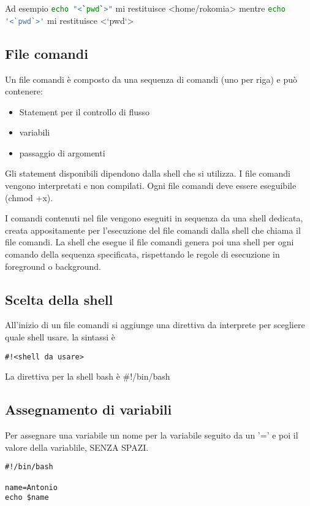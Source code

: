 \documentclass
[10pt,        %
 a4paper,     %
 onecolumn,   %
 fleqn,       %
 oneside,     %
 notitlepage, %
 openany      %
]{article}    %
\begin{document}
Ad esempio 
\lstinline[language=bash]!echo "<`pwd`>"! mi restituisce <home/rokomia> mentre
\lstinline[language=bash]!echo '<`pwd`>'! mi restituisce <`pwd`>

\subsection{File comandi}
Un file comandi è composto da una sequenza di comandi (uno per riga) e può contenere:
\begin{itemize}
    \item Statement per il controllo di flusso
    \item variabili
    \item passaggio di argomenti
\end{itemize}
Gli statement disponibili dipendono dalla shell che si utilizza. I file comandi vengono interpretati e non compilati. Ogni file comandi deve essere eseguibile (chmod +x).

I comandi contenuti nel file vengono eseguiti in sequenza da una shell dedicata, creata appositamente per l'esecuzione del file comandi dalla shell che chiama il file comandi. La shell che esegue il file comandi genera poi una shell per ogni comando della sequenza specificata, rispettando le regole di esecuzione in foreground o background.

\subsection{Scelta della shell}
All'inizio di un file comandi si aggiunge una direttiva da interprete per scegliere quale shell usare. la sintassi è
\begin{lstlisting}
#!<shell da usare>
\end{lstlisting}

La direttiva per la shell bash è #!/bin/bash

\subsection{Assegnamento di variabili}
Per assegnare una variabile un nome per la variabile seguito da un '=' e poi il valore della variablile, SENZA SPAZI.

\begin{lstlisting}
#!/bin/bash

name=Antonio
echo $name
\end{lstlisting}
\end{document}
